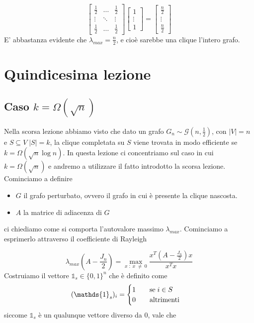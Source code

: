 \documentclass[12pt]{report}
\begin{document}
\[
\begin{bmatrix}
        \frac{1}{2} & \dots & \frac{1}{2}\\ 
        \vdots & \ddots & \vdots \\
        \frac{1}{2} & \dots & \frac{1}{2}
\end{bmatrix} 
\begin{bmatrix}
    1 \\
    \vdots \\
    1
\end{bmatrix} = 
\begin{bmatrix}
    \frac{n}{2} \\
    \vdots \\
    \frac{n}{2}
\end{bmatrix}
\]
E' abbastanza evidente che $\lambda_{max} = \frac{n}{2}$, e cioè sarebbe una clique l'intero grafo.

\chapter{Quindicesima lezione}

\section{Caso $k = \Omega(\sqrt{n})$}

\noindent
Nella scorsa lezione abbiamo visto che dato un grafo $G_n \sim \mathcal{G}(n,\frac{1}{2})$, con $|V| = n$ e $S \subseteq V \; |S| = k$, la clique completata su $S$ viene trovata in modo efficiente se $k = \Omega(\sqrt{n}\log{n})$. In questa lezione ci concentriamo sul caso in cui $k = \Omega(\sqrt{n})$ e andremo a utilizzare il fatto introdotto la scorsa lezione. Cominciamo a definire 
\begin{itemize}
    \item $G$ il grafo perturbato, ovvero il grafo in cui è presente la clique nascosta.
    \item $A$ la matrice di adiacenza di $G$
\end{itemize}
ci chiediamo come si comporta l'autovalore massimo $\lambda_{max}$. Cominciamo a esprimerlo attraverso il coefficiente di Rayleigh

$$\lambda_{max}(A - \frac{J_n}{2}) = \max_{x\;: \; x\; \neq \;0} \frac{x^T(A-\frac{J_n}{2})x}{x^Tx}$$
Costruiamo il vettore $\mathds{1}_s \in \{0,1\}^n$ che è definito come
$$(\mathds{1}_s)_i = \begin{cases}
    1 \hspace{20px} \text{se}\; i \in S \\
    0 \hspace{20px} \text{altrimenti}
\end{cases}$$
siccome $\mathds{1}_s$ è un qualunque vettore diverso da $0$, vale che 
\end{document}
